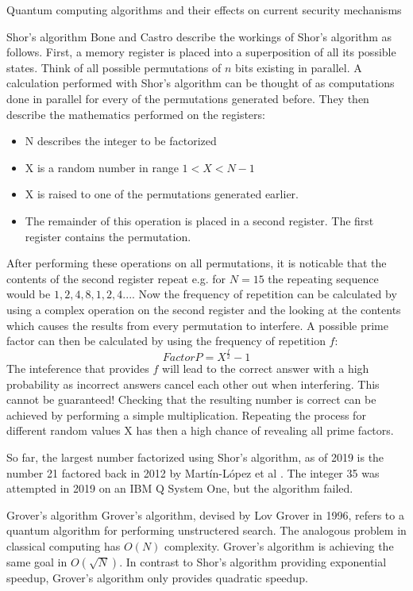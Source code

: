 \documentclass[aps,preprintnumbers,twocolumn]{revtex4}
\begin{document}
\begin{section}{Quantum computing algorithms and their effects on current security mechanisms}
\begin{subsection}{Shor's algorithm}
Bone and Castro \cite[p.6-9]{Bone} describe the workings of Shor's algorithm as follows. First, a memory register is placed into a superposition of all its possible states. Think of all possible permutations of $n$ bits existing in parallel.
A calculation performed with Shor's algorithm can be thought of as computations done in parallel for every of the permutations generated before. 
They then describe the mathematics performed on the registers: 
\begin{itemize} 
    \item N describes the integer to be factorized
    \item X is a random number in range $1 < X < N-1$
    \item X is raised to one of the permutations generated earlier.
    \item The remainder of this operation is placed in a second register. The first register contains the permutation.
\end{itemize}
After performing these operations on all permutations, it is noticable that the contents of the second register repeat e.g. for $N = 15$ the repeating sequence would be $1,2,4,8,1,2,4...$.
Now the frequency of repetition can be calculated by using a complex operation on the second register and the looking at the contents which causes the results from every permutation to interfere. A possible prime factor can then be calculated by using the frequency of repetition $f$:
\begin{equation}
Factor P = X^{\frac{f}{2}}-1
\end{equation}
The inteference that provides $f$ will lead to the correct answer with a high probability as incorrect answers cancel each other out when interfering. This cannot be guaranteed! Checking that the resulting number is correct can be achieved by performing a simple multiplication. Repeating the process for different random values X has then a high chance of revealing all prime factors.

So far, the largest number factorized using Shor's algorithm, 
as of 2019 is the number 21 factored back in 2012 by Martín-López et al \cite{article}. 
The integer 35 was attempted in 2019 on an IBM Q System One, 
but the algorithm failed. 
\end{subsection}

\begin{subsection}{Grover's algorithm}
Grover's algorithm, devised by Lov Grover in 1996,
refers to a quantum algorithm for performing unstructered search. 
The analogous problem in classical computing has $O(N)$ complexity. 
Grover's algorithm is achieving the same goal in $O(\sqrt{N})$. 
In contrast to Shor's algorithm providing exponential speedup, 
Grover's algorithm only provides quadratic speedup. 


\end{subsection}
\end{section}
\end{document}
